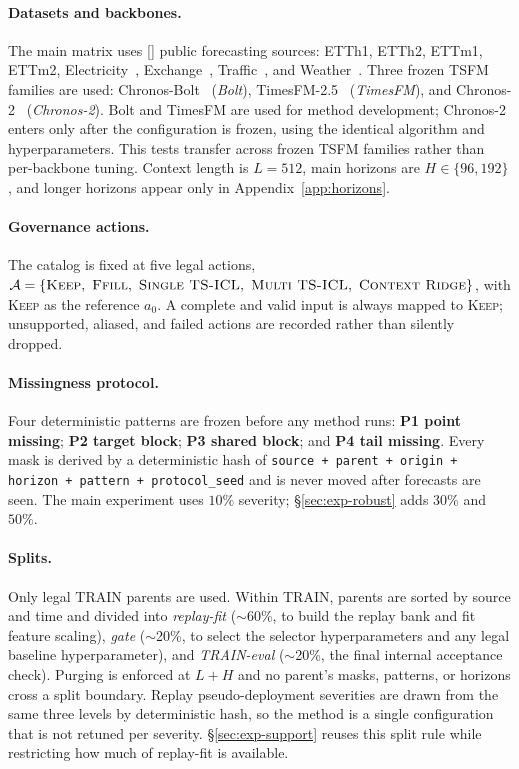 \documentclass{article}
\newcommand{\ph}[1]{\textcolor{phgray}{\textsf{[\detokenize{#1}]}}}
\newcommand{\tsfm}{TSFM}
\newcommand{\calA}{\mathcal{A}}
\begin{document}
\paragraph{Datasets and backbones.}
The main matrix uses \ph{N_DATASETS} public forecasting sources: ETTh1, ETTh2, ETTm1,
ETTm2, Electricity~\citep{uci_electricity}, Exchange~\citep{lai2018lstnet},
Traffic~\citep{pems}, and Weather~\citep{wu2021autoformer}. Three frozen \tsfm{} families
are used: Chronos-Bolt~\citep{chronosbolt2025} (\emph{Bolt}),
TimesFM-2.5~\citep{das2024timesfm} (\emph{TimesFM}), and Chronos-2~\citep{chronos2_2025}
(\emph{Chronos-2}). Bolt and TimesFM are used for method development; Chronos-2 enters
only after the configuration is frozen, using the identical algorithm and hyperparameters.
This tests transfer across frozen \tsfm{} families rather than per-backbone tuning. Context
length is $L = 512$, main horizons are $H \in \{96, 192\}$, and longer horizons appear
only in Appendix~\ref{app:horizons}.

\paragraph{Governance actions.}
The catalog is fixed at five legal actions,
$\calA = \{\textsc{Keep},\ \textsc{Ffill},\ \textsc{Single TS-ICL},\ \textsc{Multi TS-ICL},\ \textsc{Context Ridge}\}$,
with \textsc{Keep} as the reference $a_0$. A complete and valid input is always mapped to
\textsc{Keep}; unsupported, aliased, and failed actions are recorded rather than silently
dropped.

\paragraph{Missingness protocol.}
Four deterministic patterns are frozen before any method runs: \textbf{P1 point missing};
\textbf{P2 target block}; \textbf{P3 shared block}; and \textbf{P4 tail missing}. Every mask
is derived by a deterministic hash of \texttt{source + parent + origin + horizon + pattern
+ protocol\_seed} and is never moved after forecasts are seen. The main experiment uses
$10\%$ severity; \S\ref{sec:exp-robust} adds $30\%$ and $50\%$.

\paragraph{Splits.}
Only legal TRAIN parents are used. Within TRAIN, parents are sorted by source and time and
divided into \emph{replay-fit} ($\sim$60\%, to build the replay bank and fit feature
scaling), \emph{gate} ($\sim$20\%, to select the selector hyperparameters and any legal
baseline hyperparameter), and \emph{TRAIN-eval} ($\sim$20\%, the final internal acceptance
check). Purging is enforced at $L + H$ and no parent's masks, patterns, or horizons cross a
split boundary. Replay pseudo-deployment severities are drawn from the same three levels by
deterministic hash, so the method is a single configuration that is not retuned per severity.
\S\ref{sec:exp-support} reuses this split rule while restricting how much of replay-fit is
available.
\end{document}
